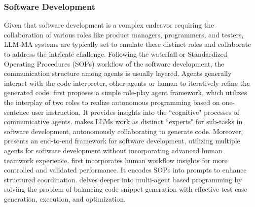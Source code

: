 \subsubsection{Software Development}
Given that software development is a complex endeavor requiring the collaboration of various roles like product managers, programmers, and testers, LLM-MA systems are typically set to emulate these distinct roles and collaborate to address the intricate challenge. Following the waterfall or Standardized Operating Procedures (SOPs) workflow of the software development, the communication structure among agents is usually layered. Agents generally interact with the code interpreter, other agents or human to iteratively refine the generated code.
\cite{li2023camel} first proposes a simple role-play agent framework, which utilizes the interplay of two roles to realize autonomous programming based on one-sentence user instruction. It provides insights into the ``cognitive" processes of communicative agents. \cite{dong2023selfcollaboration} makes LLMs work as distinct ``experts" for sub-tasks in software development, autonomously collaborating to generate code. Moreover, \cite{qian2023communicative} presents an end-to-end framework for software development, utilizing multiple agents for software development without incorporating advanced human teamwork experience. \cite{hong2023metagpt} first incorporates human workflow insights for more controlled and validated performance. It encodes SOPs into prompts to enhance structured coordination. \cite{huang2023agentcoder} delves deeper into multi-agent based programming by solving the problem of balancing code snippet generation with effective test case generation, execution, and optimization. 


